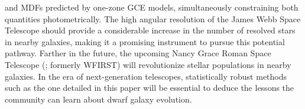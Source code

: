 \documentclass[foo.tex]{subfiles}
\begin{document}
and MDFs predicted by one-zone GCE models, simultaneously constraining both
quantities photometrically.
The high angular resolution of the James Webb Space Telescope
\citep[JWST;][]{Gardner2006} should provide a considerable increase in the
number of resolved stars in nearby galaxies, making it a promising instrument
to pursue this potential pathway.
Farther in the future, the upcoming Nancy Grace Roman Space Telescope
(\citealp{Spergel2013, Spergel2015}; formerly WFIRST) will revolutionize
stellar populations in nearby galaxies.
In the era of next-generation telescopes, statistically robust methods such as
the one detailed in this paper will be essential to deduce the lessons the
community can learn about dwarf galaxy evolution.
\end{document}
